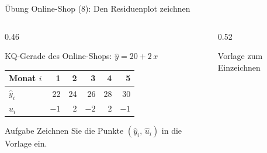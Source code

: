 \documentclass[aspectratio=169,11pt]{beamer}
\begin{document}
\begin{frame}{Übung Online-Shop (8): Den Residuenplot zeichnen}
  \begin{columns}[T]
    \begin{column}{0.46\textwidth}
      \begin{block}{KQ-Gerade des Online-Shops: $\hat{y} = 20 + 2\,x$}
        \begin{center}
          \renewcommand{\arraystretch}{1.1}
          \begin{tabular}{l*{5}{r}}
            \toprule
            Monat $i$   & 1    & 2   & 3    & 4   & 5    \\
            \midrule
            $\hat{y}_i$ & 22   & 24  & 26   & 28  & 30   \\
            $\hat{u}_i$ & $-1$ & $2$ & $-2$ & $2$ & $-1$ \\
            \bottomrule
          \end{tabular}
        \end{center}
      \end{block}
      \begin{exampleblock}{Aufgabe}
        Zeichnen Sie die Punkte $(\hat{y}_i,\,\hat{u}_i)$ in die Vorlage ein.
      \end{exampleblock}
    \end{column}
    \begin{column}{0.52\textwidth}
      \begin{center}\footnotesize Vorlage zum Einzeichnen\end{center}
    \end{column}
  \end{columns}
\end{frame}
\end{document}

